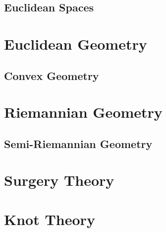 \documentclass{book}                                                           %
\begin{document}
                \chapter{Euclidean Spaces}
                    \renewcommand{\chapterPath}{\partPath/Euclidean_Spaces}
                    \label{chapt:Euclidean_Spaces}%
                    
            \part{Euclidean Geometry}
                \renewcommand{\partPath}{\bookPath/Geometry/Euclidean_Geometry}
                \chapter{Convex Geometry}
                    \renewcommand{\chapterPath}{\partPath/Convex_Geometry}
                    \label{chapt:Euclidean_Spaces}%
                    
            \part{Riemannian Geometry}
                \renewcommand{\partPath}{\bookPath/Geometry/Riemannian_Geometry}
                \chapter{Semi-Riemannian Geometry}
                    \renewcommand{\chapterPath}{\partPath/Semi_Riemannian_Geometry}
                    \label{chapt:Semi_Riemannian}%
                    
        \clearpage
        \setcounter{endpage}{\thepage}
    \fi

            \label{book:Geometric_Topology}%
            \renewcommand{\chapterPath}{\bookPath/Geometric_Topology}
            \setcounter{page}{\value{endpage}}
            \part{Surgery Theory}
                
            \part{Knot Theory}
                
        \clearpage
        \setcounter{endpage}{\thepage}
    \fi
\end{document}
